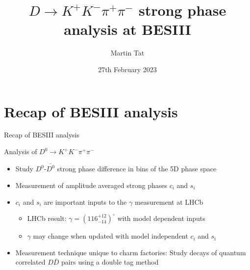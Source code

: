 \documentclass{beamer}
\title[$K^+K^-\pi^+\pi^-$]{\texorpdfstring{$D\to K^+K^-\pi^+\pi^-$}{K+K-pi+pi-} strong phase analysis at BESIII}
\author{Martin Tat}
\institute{Oxford LHCb}
\date{27th February 2023}
\begin{document}
\begin{frame}
  \titlepage
\end{frame}


\section{Recap of BESIII analysis}

\begin{frame}{Recap of BESIII analysis}
  \begin{center}
    \Large{Analysis of $D^0\to K^+K^-\pi^+\pi^-$}
  \end{center}
  \vspace{0.5cm}
  \begin{itemize}
    \setlength\itemsep{1.0em}
    \item{Study $D^0$-$\bar{D^0}$ strong phase difference in bins of the 5D phase space}
    \item{Measurement of amplitude averaged strong phases $c_i$ and $s_i$}
    \item{$c_i$ and $s_i$ are important inputs to the $\gamma$ measurement at LHCb}
    \begin{itemize}
      \item{LHCb result: $\gamma = (116^{+12}_{-14})^\circ$ with model dependent inputs}
      \item{$\gamma$ may change when updated with model independent $c_i$ and $s_i$}
    \end{itemize}
    \item{Measurement technique unique to charm factories: Study decays of quantum correlated $D\bar{D}$ pairs using a double tag method}
  \end{itemize}
\end{frame}
\end{document}
